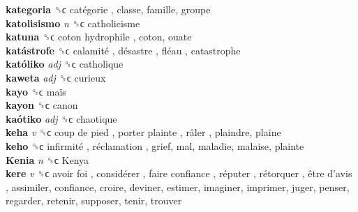 \textbf{kategoria} ␝ϲ   catégorie , classe, famille, groupe  \\
\textbf{katolisismo} \emph{n}  ␝ϲ  catholicisme  \\
\textbf{katuna} ␝ϲ   coton hydrophile , coton, ouate  \\
\textbf{katástrofe} ␝ϲ   calamité ,  désastre ,  fléau , catastrophe  \\
\textbf{katóliko} \emph{adj}  ␝ϲ  catholique  \\
\textbf{kaweta} \emph{adj}  ␝ϲ  curieux  \\
\textbf{kayo} ␝ϲ   maïs   \\
\textbf{kayon} ␝ϲ  canon  \\
\textbf{kaótiko} \emph{adj}  ␝ϲ  chaotique  \\
\textbf{keha} \emph{v}  ␝ϲ   coup de pied ,  porter plainte ,  râler , plaindre, plaine  \\
\textbf{keho} ␝ϲ   infirmité ,  réclamation , grief, mal, maladie, malaise, plainte  \\
\textbf{Kenia} \emph{n}  ␝ϲ   Kenya   \\
\textbf{kere} \emph{v}  ␝ϲ   avoir foi ,  considérer ,  faire confiance ,  réputer ,  rétorquer ,  être d’avis , assimiler, confiance, croire, deviner, estimer, imaginer, imprimer, juger, penser, regarder, retenir, supposer, tenir, trouver  \\

